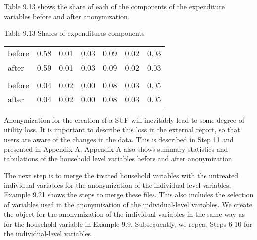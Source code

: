 \documentclass[letterpaper,10pt,english]{sphinxmanual}
\begin{document}
Table 9.13 shows the share of each of the components of the expenditure
variables before and after anonymization.

Table 9.13 Shares of expenditures components


\begin{savenotes}\sphinxattablestart
\centering
\begin{tabulary}{\linewidth}[t]{|T|T|T|T|T|T|T|}
\hline
\sphinxstyletheadfamily &\sphinxstyletheadfamily 
{}
&\sphinxstyletheadfamily 
{}
&\sphinxstyletheadfamily 
{}
&\sphinxstyletheadfamily 
{}
&\sphinxstyletheadfamily 
{}
&\sphinxstyletheadfamily 
{}
\\
\hline
before
&
0.58
&
0.01
&
0.03
&
0.09
&
0.02
&
0.03
\\
\hline
after
&
0.59
&
0.01
&
0.03
&
0.09
&
0.02
&
0.03
\\
\hline&
&
&
&
&
&
\\
\hline
before
&
0.04
&
0.02
&
0.00
&
0.08
&
0.03
&
0.05
\\
\hline
after
&
0.04
&
0.02
&
0.00
&
0.08
&
0.03
&
0.05
\\
\hline
\end{tabulary}
\par
\sphinxattableend\end{savenotes}

Anonymization for the creation of a SUF will inevitably lead to some
degree of utility loss. It is important to describe this loss in the
external report, so that users are aware of the changes in the data.
This is described in Step 11 and presented in Appendix A. Appendix A
also shows summary statistics and tabulations of the household level
variables before and after anonymization.


The next step is to merge the treated household variables with the
untreated individual variables for the anonymization of the individual
level variables. Example 9.21 shows the steps to merge these files. This
also includes the selection of variables used in the anonymization of
the individual-level variables. We create the  object for the
anonymization of the individual variables in the same way as for the
household variable in Example 9.9. Subsequently, we repeat Steps 6-10
for the individual-level variables.
\end{document}
